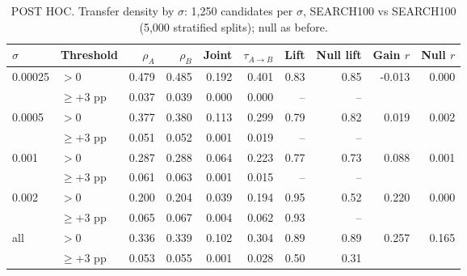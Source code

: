 \begin{table}[t]
\centering
\small
\begin{adjustbox}{max width=\linewidth}
\begin{tabular}{llrrrrrrrr}
\toprule
$\sigma$ & Threshold & $\rho_A$ & $\rho_B$ & Joint & $\tau_{A\to B}$ & Lift & Null lift & Gain $r$ & Null $r$ \\
\midrule
0.00025 & $>0$ & 0.479 & 0.485 & 0.192 & 0.401 & 0.83 & 0.85 & -0.013 & 0.000 \\
 & $\ge$+3 pp & 0.037 & 0.039 & 0.000 & 0.000 & -- & -- &  &  \\
0.0005 & $>0$ & 0.377 & 0.380 & 0.113 & 0.299 & 0.79 & 0.82 & 0.019 & 0.002 \\
 & $\ge$+3 pp & 0.051 & 0.052 & 0.001 & 0.019 & -- & -- &  &  \\
0.001 & $>0$ & 0.287 & 0.288 & 0.064 & 0.223 & 0.77 & 0.73 & 0.088 & 0.001 \\
 & $\ge$+3 pp & 0.061 & 0.063 & 0.001 & 0.015 & -- & -- &  &  \\
0.002 & $>0$ & 0.200 & 0.204 & 0.039 & 0.194 & 0.95 & 0.52 & 0.220 & 0.000 \\
 & $\ge$+3 pp & 0.065 & 0.067 & 0.004 & 0.062 & 0.93 & -- &  &  \\
all & $>0$ & 0.336 & 0.339 & 0.102 & 0.304 & 0.89 & 0.89 & 0.257 & 0.165 \\
 & $\ge$+3 pp & 0.053 & 0.055 & 0.001 & 0.028 & 0.50 & 0.31 &  &  \\
\bottomrule
\end{tabular}
\end{adjustbox}
\caption{POST HOC. Transfer density by $\sigma$: 1,250 candidates per $\sigma$, SEARCH100 vs SEARCH100 (5,000 stratified splits); null as before.}
\label{tab:sigma-transfer}
\end{table}
